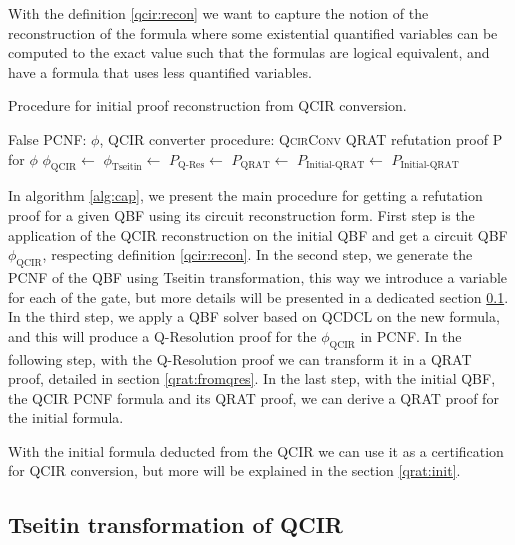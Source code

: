 With the definition \ref{qcir:recon} we want to capture the notion of the reconstruction of the formula where some existential quantified variables can be computed to the exact value such that the formulas are logical equivalent, and have a formula that uses less quantified variables.

\begin{algorithm}[H]
\caption{Procedure for initial proof reconstruction from QCIR conversion.}\label{alg:cap}
\begin{algorithmic}[1]
\Require False PCNF: $\phi$, QCIR converter procedure: \textsc{QcirConv}
\Ensure QRAT refutation proof P for $\phi$
\State $\phi_\text{QCIR} \gets$ 
\State $\phi_\text{Tseitin} \gets$ 
\State $P_\text{Q-Res} \gets$ 
\State $P_\text{QRAT} \gets$ 
\State $P_\text{Initial-QRAT} \gets$ 
\State \Return $P_\text{Initial-QRAT}$
\EndProcedure
\end{algorithmic}
\end{algorithm}

In algorithm \ref{alg:cap}, we present the main procedure for getting a refutation proof for a given QBF using its circuit reconstruction form. First step is the application of the QCIR reconstruction on the initial QBF and get a circuit QBF $\phi_\text{QCIR}$, respecting definition \ref{qcir:recon}. In the second step, we generate the PCNF of the QBF using Tseitin transformation, this way we introduce a variable for each of the gate, but more details will be presented in a dedicated section \ref{tseitin:qcir}.  In the third step, we apply a QBF solver based on QCDCL on the new formula, and this will produce a Q-Resolution proof for the $\phi_\text{QCIR}$ in PCNF. In the following step, with the Q-Resolution proof we can transform it in a QRAT proof, detailed in section \ref{qrat:fromqres}. In the last step, with the initial QBF, the QCIR PCNF formula and its QRAT proof, we can derive a QRAT proof for the initial formula.

With the initial formula deducted from the QCIR we can use it as a certification for QCIR conversion, but more will be explained in the section \ref{qrat:init}.

\subsection{Tseitin transformation of QCIR}\label{tseitin:qcir}

